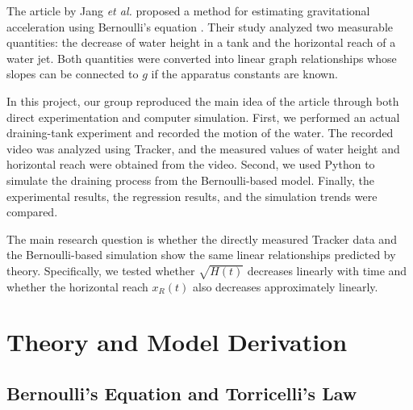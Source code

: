 \documentclass[11pt,letterpaper]{article}
\begin{document}
The article by Jang \textit{et al.} proposed a method for estimating gravitational acceleration using Bernoulli's equation \cite{jang2024}. Their study analyzed two measurable quantities: the decrease of water height in a tank and the horizontal reach of a water jet. Both quantities were converted into linear graph relationships whose slopes can be connected to $g$ if the apparatus constants are known.

In this project, our group reproduced the main idea of the article through both direct experimentation and computer simulation. First, we performed an actual draining-tank experiment and recorded the motion of the water. The recorded video was analyzed using Tracker, and the measured values of water height and horizontal reach were obtained from the video. Second, we used Python to simulate the draining process from the Bernoulli-based model. Finally, the experimental results, the regression results, and the simulation trends were compared.

The main research question is whether the directly measured Tracker data and the Bernoulli-based simulation show the same linear relationships predicted by theory. Specifically, we tested whether $\sqrt{H(t)}$ decreases linearly with time and whether the horizontal reach $x_R(t)$ also decreases approximately linearly.

\section{Theory and Model Derivation}

\subsection{Bernoulli's Equation and Torricelli's Law}
\end{document}
